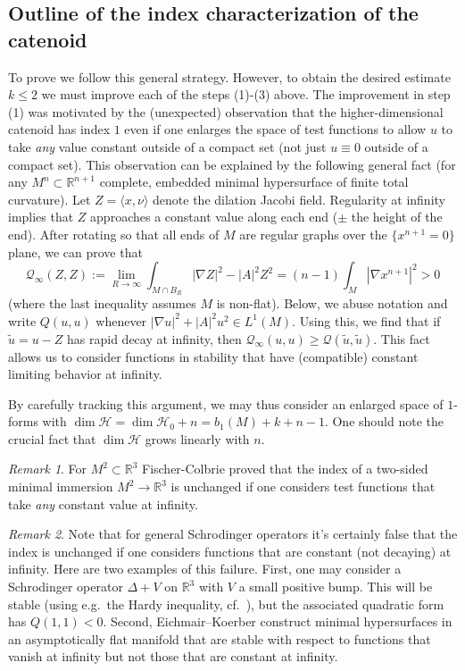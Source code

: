 \documentclass[11pt]{amsart}
\numberwithin{equation}{section}
\theoremstyle{plain}
\theoremstyle{definition}
\theoremstyle{remark}
\newtheorem{remark}[remark]{Remark}
\newcommand{\R}{\mathbb{R}}
\newcommand{\Hcal}{\mathcal H}
\newcommand{\Hzero}{\mathcal H_0}
\newcommand{\Qcal}{\mathcal Q}
\newcommand{\bangle}[1]{\langle #1 \rangle}
\begin{document}
\subsection{Outline of the index characterization of the catenoid} To prove  we follow this general strategy. However, to obtain the desired estimate $k\leq 2$ we must improve each of the steps (1)-(3) above. The improvement in step (1) was motivated by the (unexpected) observation that the higher-dimensional catenoid has index $1$ even if one enlarges the space of test functions to allow $u$ to take \emph{any} value constant outside of a compact set (not just $u \equiv 0$ outside of a compact set). This observation can be explained by the following general fact (for any $M^n\subset \R^{n+1}$ complete, embedded minimal hypersurface of finite total curvature). Let $Z = \bangle{x,\nu}$ denote the dilation Jacobi field. Regularity at infinity implies that $Z$ approaches a constant value along each end ($\pm$ the height of the end). After rotating so that all ends of $M$ are regular graphs over the $\{x^{n+1} = 0\}$ plane, we can prove that
\begin{equation}\label{eq:QZZ}
\Qcal_\infty(Z,Z) := \lim_{R\to\infty} \int_{M\cap B_R} |\nabla Z|^2 - |A|^2 Z^2 = (n-1) \int_M |\nabla x^{n+1}|^2 > 0
\end{equation}
(where the last inequality assumes $M$ is non-flat). Below, we  abuse notation and write $Q(u,u)$ whenever $|\nabla u|^2 + |A|^2 u^2 \in L^1(M)$. Using this, we find that if $\tilde u = u -Z$ has rapid decay at infinity, then $\Qcal_\infty(u,u) \geq \Qcal(\tilde u,\tilde u)$. This fact allows us to consider functions in stability that have (compatible) constant limiting behavior at infinity. 

By carefully tracking this argument, we may thus consider an enlarged space of $1$-forms with $\dim\Hcal = \dim \Hzero + n = b_1({M}) + k + n - 1$. One should note the crucial fact that $\dim \Hcal$ grows linearly with $n$.  


\begin{remark}
For $M^2\subset\R^3$ Fischer-Colbrie  \cite{FC85} proved that the index of a two-sided minimal immersion $M^2\to\R^3$ is unchanged if one considers test functions that take \emph{any} constant value at infinity. 
\end{remark}
\begin{remark}
Note that for general Schrodinger operators it's certainly false that the index is unchanged if one considers functions that are constant (not decaying) at infinity. Here are two examples of this failure. First, one may consider a Schrodinger operator $\Delta+V$ on $\R^3$ with $V$ a small positive bump. This will be stable (using e.g.\ the Hardy inequality, cf.\ \cite[Example B.1]{CLS2026}), but the associated quadratic form has $Q(1,1) < 0$. Second, Eichmair--Koerber construct \cite[Theorem 1.2]{EichmairKoerber} minimal hypersurfaces in an asymptotically flat manifold that are stable with respect to functions that vanish at infinity but not those that are constant at infinity. 
\end{remark}
\end{document}
